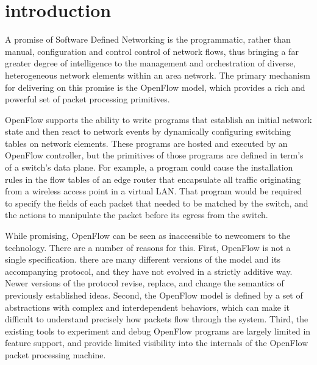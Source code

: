 
\section{introduction}
\label{sec:ref}

A promise of Software Defined Networking is the programmatic, rather
than manual, configuration and control control of network flows, thus
bringing a far greater degree of intelligence to the management and
orchestration of diverse, heterogeneous network elements within an
area network. The primary mechanism for delivering on this promise is
the OpenFlow model, which provides a rich and powerful set of packet 
processing primitives.


OpenFlow supports the ability to write programs that establish an initial
network state and then react to network events by dynamically configuring 
switching tables on network elements. These programs are hosted and executed by 
an OpenFlow controller, but the primitives of those programs are
defined in term's of a switch's data plane. For example, a program
could cause the installation rules in the flow tables of an edge router
that encapsulate all traffic originating from a wireless access
point in a virtual LAN. That program would be required to specify
the fields of each packet that needed to be matched by the switch, and 
the actions to manipulate the packet before its egress from the
switch.

While promising, OpenFlow can be seen as inaccessible to newcomers to the 
technology. There are a number of reasons for this.
First, OpenFlow is not a single specification. there are many different
versions of the model and its accompanying protocol, and they have not
evolved in a strictly additive way. Newer versions of the protocol revise,
replace, and change the semantics of previously established ideas.
Second, the OpenFlow model is defined by a set of abstractions with
complex and interdependent behaviors, which can make it difficult to 
understand precisely how packets flow through the system.
Third, the existing tools to experiment and debug OpenFlow programs are 
largely limited in feature support, and provide limited visibility into the 
internals of the OpenFlow packet processing machine.


